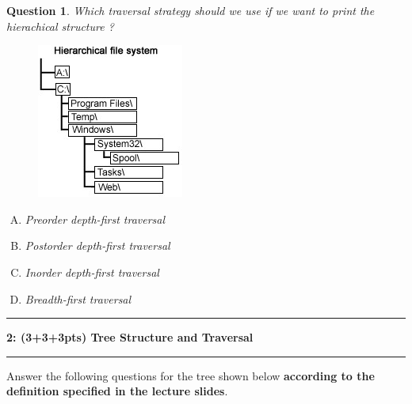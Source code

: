 \documentclass[10.5pt]{article}
\newcommand\question[2]{\vspace{.25in}\hrule\textbf{#1: #2}\vspace{.5em}\hrule\vspace{.10in}}
\newtheorem{Q}{Question}
\begin{document}
	\vspace{0.5cm}

	\pagebreak

	\begin{Q} Which traversal strategy should we use if we want to print the hierachical structure ?

	\begin{figure}[h]
	\centering
	\includegraphics[width=0.27\linewidth]{hierarchy}
	\label{fig:hierarchy}
	\end{figure}
		\begin{enumerate}[(A)]
			\item Preorder depth-first traversal
			\item Postorder depth-first traversal
			\item Inorder depth-first traversal
			\item Breadth-first traversal
		\end{enumerate}
	\end{Q}
    

\question{2}{(3+3+3pts) Tree Structure and Traversal}
	
	Answer the following questions for the tree shown below \textbf{according to  the definition specified in the lecture slides}.
	
\end{document}
